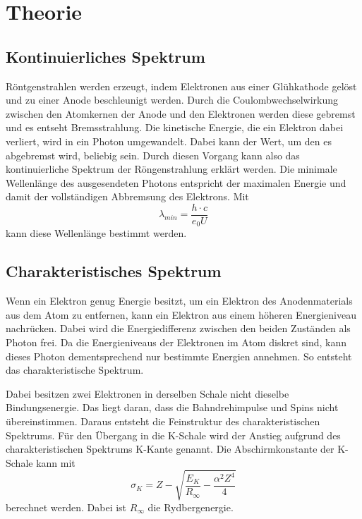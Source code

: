 \section{Theorie}
\label{sec:Theorie}
\subsection{Kontinuierliches Spektrum}
Röntgenstrahlen werden erzeugt, indem Elektronen aus einer Glühkathode gelöst und zu einer Anode beschleunigt werden.
Durch die Coulombwechselwirkung zwischen den Atomkernen der Anode und den Elektronen werden diese gebremst und es entseht Bremsstrahlung.
Die kinetische Energie, die ein Elektron dabei verliert, wird in ein Photon umgewandelt.
Dabei kann der Wert, um den es abgebremst wird, beliebig sein.
Durch diesen Vorgang kann also das kontinuierliche Spektrum der Röngenstrahlung erklärt werden.
Die minimale Wellenlänge des ausgesendeten Photons entspricht der maximalen Energie und damit der vollständigen Abbremsung des Elektrons.
Mit 
\begin{equation}
    \lambda_{min}=\frac{h \cdot c}{e_0 U}
    \label{eqn:Wellenlänge}
\end{equation}
kann diese Wellenlänge bestimmt werden.
\\

\subsection{Charakteristisches Spektrum}
Wenn ein Elektron genug Energie besitzt, um ein Elektron des Anodenmaterials aus dem Atom zu entfernen, kann ein Elektron aus einem höheren Energieniveau nachrücken.
Dabei wird die Energiedifferenz zwischen den beiden Zuständen als Photon frei.
Da die Energieniveaus der Elektronen im Atom diskret sind, kann dieses Photon dementsprechend nur bestimmte Energien annehmen.
So entsteht das charakteristische Spektrum.

Dabei besitzen zwei Elektronen in derselben Schale nicht dieselbe Bindungsenergie.
Das liegt daran, dass die Bahndrehimpulse und Spins nicht übereinstimmen.
Daraus entsteht die Feinstruktur des charakteristischen Spektrums.
Für den Übergang in die K-Schale wird der Anstieg aufgrund des charakteristischen Spektrums K-Kante genannt.
Die Abschirmkonstante der K-Schale kann mit 
\begin{equation}
    \sigma_K=Z-\sqrt{\frac{E_K}{R_\infty}-\frac{\alpha^2 Z^4}{4}}
    \label{eqn:Abschirmkonstante}
\end{equation}
berechnet werden.
Dabei ist $R_\infty$ die Rydbergenergie.

